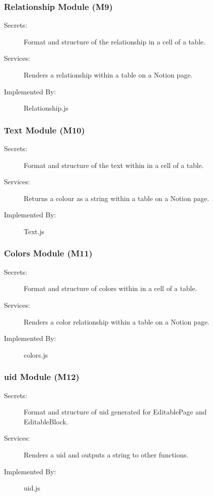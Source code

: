 \documentclass[12pt, titlepage]{article}
\begin{document}
\subsubsection{Relationship Module (M9)}

\begin{description}
\item[Secrets:] Format and structure of the relationship in a cell of a table.
\item[Services:] Renders a relationship within a table on a Notion page.
\item[Implemented By:] Relationship.js
\end{description}

\subsubsection{Text Module (M10)}

\begin{description} 
\item[Secrets:] Format and structure of the text within in a cell of a table.
\item[Services:] Returns a colour as a string within a table on a Notion page.
\item[Implemented By:] Text.js
\end{description}

\subsubsection{Colors Module (M11)}

\begin{description}
\item[Secrets:] Format and structure of colors within in a cell of a table.
\item[Services:] Renders a color relationship within a table on a Notion page.
\item[Implemented By:] colors.js
\end{description}

\subsubsection{uid Module (M12)}

\begin{description} 
\item[Secrets:] Format and structure of uid generated for EditablePage and EditableBlock.
\item[Services:] Renders a uid and outputs a string to other functions.
\item[Implemented By:] uid.js
\end{description}
\end{document}
